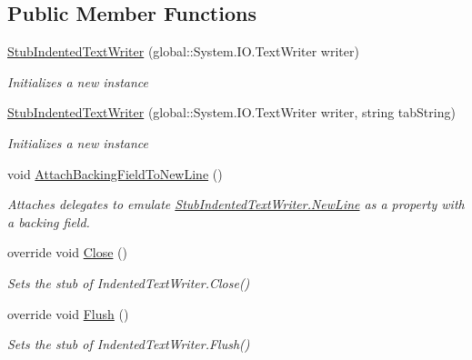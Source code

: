 \subsection*{Public Member Functions}
\begin{DoxyCompactItemize}
\item 
\hyperlink{class_system_1_1_code_dom_1_1_compiler_1_1_fakes_1_1_stub_indented_text_writer_ac5f99aa8f0d704ddec4dc55dcbeb7bfe}{Stub\-Indented\-Text\-Writer} (global\-::\-System.\-I\-O.\-Text\-Writer writer)
\begin{DoxyCompactList}\small\item\em Initializes a new instance\end{DoxyCompactList}\item 
\hyperlink{class_system_1_1_code_dom_1_1_compiler_1_1_fakes_1_1_stub_indented_text_writer_a0a1a702705e6f0de055cce79bc4b7ea0}{Stub\-Indented\-Text\-Writer} (global\-::\-System.\-I\-O.\-Text\-Writer writer, string tab\-String)
\begin{DoxyCompactList}\small\item\em Initializes a new instance\end{DoxyCompactList}\item 
void \hyperlink{class_system_1_1_code_dom_1_1_compiler_1_1_fakes_1_1_stub_indented_text_writer_ab9e9df07cd8095c454f0e3ab116bec0c}{Attach\-Backing\-Field\-To\-New\-Line} ()
\begin{DoxyCompactList}\small\item\em Attaches delegates to emulate \hyperlink{class_system_1_1_code_dom_1_1_compiler_1_1_fakes_1_1_stub_indented_text_writer_a451a0d4709a0d6cb5dd4f6289331a1a3}{Stub\-Indented\-Text\-Writer.\-New\-Line} as a property with a backing field.\end{DoxyCompactList}\item 
override void \hyperlink{class_system_1_1_code_dom_1_1_compiler_1_1_fakes_1_1_stub_indented_text_writer_a31e0c648014045b7c61916bc5dae97e7}{Close} ()
\begin{DoxyCompactList}\small\item\em Sets the stub of Indented\-Text\-Writer.\-Close()\end{DoxyCompactList}\item 
override void \hyperlink{class_system_1_1_code_dom_1_1_compiler_1_1_fakes_1_1_stub_indented_text_writer_adf88b2f377d8b0fd17103393e432a3cc}{Flush} ()
\begin{DoxyCompactList}\small\item\em Sets the stub of Indented\-Text\-Writer.\-Flush()\end{DoxyCompactList}\item 

\end{DoxyCompactItemize}

